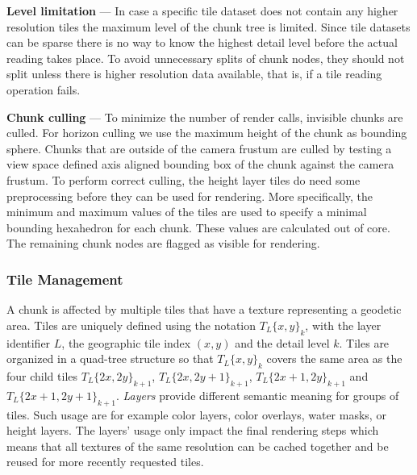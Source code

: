 \documentclass[journal]{vgtc}                %
\begin{document}
\noindent\textbf{Level limitation} ---
In case a specific tile dataset does not contain any higher resolution tiles the maximum level of the chunk tree is limited.
Since tile datasets can be sparse there is no way to know the highest detail level before the actual reading takes place.
To avoid unnecessary splits of chunk nodes, they should not split unless there is higher resolution data available, that is, if a tile reading operation fails.

\noindent\textbf{Chunk culling} --- To minimize the number of render calls, invisible chunks are culled.
For horizon culling we use the maximum height of the chunk as bounding sphere.
Chunks that are outside of the camera frustum are culled by testing a view space defined axis aligned bounding box of the chunk against the camera frustum.
To perform correct culling, the height layer tiles do need some preprocessing before they can be used for rendering. More specifically, the minimum and maximum values of the tiles are used to specify a minimal bounding hexahedron for each chunk. These values are calculated out of core.
The remaining chunk nodes are flagged as visible for rendering.

\subsubsection{Tile Management} \label{sec:tilemgmt}
A chunk is affected by multiple tiles that have a texture representing a geodetic area. Tiles are uniquely defined using the notation $T_L\{x,y\}_k$, with the layer identifier $L$, the geographic tile index $\left( x,y \right)$ and the detail level $k$.
Tiles are organized in a quad-tree structure so that $T_L\{x,y\}_k$ covers the same area as the four child tiles $T_L\{2x,2y\}_{k+1}$, $T_L\{2x,2y+1\}_{k+1}$, $T_L\{2x+1,2y\}_{k+1}$ and $T_L\{2x+1,2y+1\}_{k+1}$.
\emph{Layers} provide different semantic meaning for groups of tiles. Such usage are for example color layers, color overlays, water masks, or height layers.
The layers' usage only impact the final rendering steps which means that all textures of the same resolution can be cached together and be reused for more recently requested tiles.
\end{document}

